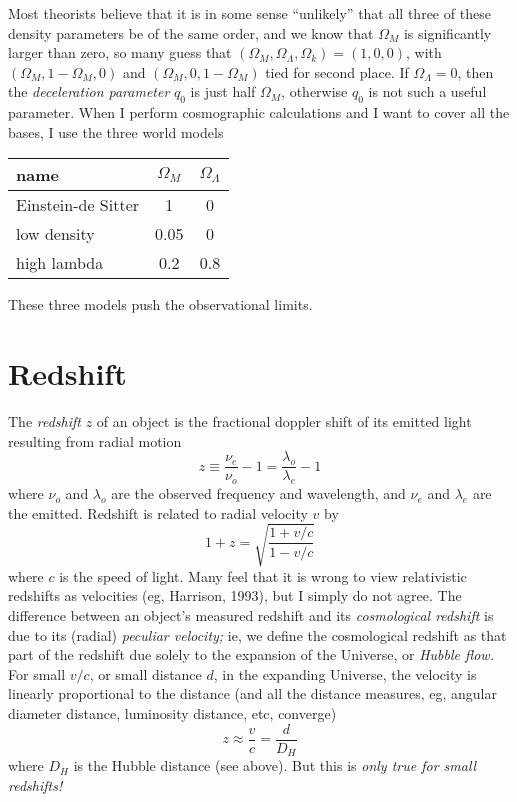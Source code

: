 Most theorists believe that it is in some sense ``unlikely'' that all
three of these density parameters be of the same order, and we know
that $\Omega_M$ is significantly larger than zero, so many guess that
$(\Omega_M,\Omega_{\Lambda},\Omega_k)=(1,0,0)$, with
$(\Omega_M,1-\Omega_M,0)$ and $(\Omega_M,0,1-\Omega_M)$ tied for
second place.  If $\Omega_{\Lambda}=0$, then the {\em deceleration
parameter\/} $q_0$ is just half $\Omega_M$, otherwise $q_0$ is not
such a useful parameter.  When I perform cosmographic calculations and
I want to cover all the bases, I use the three world models
\begin{center}
\begin{tabular}{lcc}
name & $\Omega_M$ & $\Omega_{\Lambda}$ \\ \hline
Einstein-de Sitter & 1 & 0 \\
low density & 0.05 & 0 \\
high lambda & 0.2 & 0.8 \\
\end{tabular}
\end{center}
These three models push the observational limits.


\section{Redshift}

The {\em redshift\/} $z$ of an object is the fractional doppler shift
of its emitted light resulting from radial motion
\begin{equation}
z\equiv \frac{\nu_e}{\nu_o}-1 = \frac{\lambda_o}{\lambda_e}-1
\end{equation}
where $\nu_o$ and $\lambda_o$ are the observed frequency and
wavelength, and $\nu_e$ and $\lambda_e$ are the emitted.  Redshift is
related to radial velocity $v$ by
\begin{equation}
1+z = \sqrt{\frac{1+v/c}{1-v/c}}
\end{equation}
where $c$ is the speed of light.  Many feel that it is wrong to view
relativistic redshifts as velocities (eg, Harrison, 1993), but I
simply do not agree.  The difference between an object's measured
redshift and its {\em cosmological redshift\/} is due to its (radial)
{\em peculiar velocity;\/} ie, we define the cosmological redshift as
that part of the redshift due solely to the expansion of the Universe,
or {\em Hubble flow.\/} For small $v/c$, or small distance $d$, in the
expanding Universe, the velocity is linearly proportional to the
distance (and all the distance measures, eg, angular diameter
distance, luminosity distance, etc, converge)
\begin{equation}
z \approx \frac{v}{c} = \frac{d}{D_H}
\end{equation}
where $D_H$ is the Hubble distance (see above).  But this is {\em only
true for small redshifts!\/}

